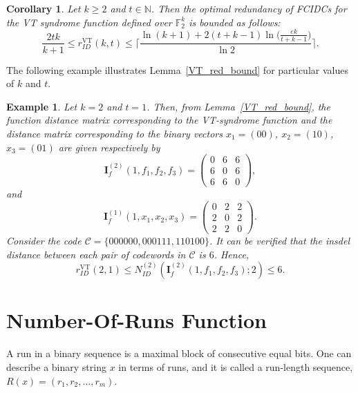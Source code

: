 \documentclass[11 pt]{article}
\numberwithin{equation}{section}
\newtheorem{corollary}[theorem]{Corollary}
\newtheorem{example}[theorem]{Example}
\begin{document}
    \begin{corollary}
        Let $k \geq  2$ and $t \in \mathbb{N}$. Then the optimal redundancy of FCIDCs for the VT syndrome function defined over $\mathbb{F}_2^k$ is bounded as follows:
        \[
            \frac{2tk}{k+1} \leq r^{\text{VT}}_{ID}(k, t) \leq \Bigg \lceil \frac{\ln (k+1) + 2(t+k-1)\ln \Big(\frac{ek}{t+ k - 1}\Big)}{\ln 2} \Bigg \rceil.
        \]
    \end{corollary}
    The following example illustrates Lemma~\ref{VT_red_bound} for particular values of $k$ and $t$.


    \begin{example}
        Let \( k = 2 \) and \( t = 1 \). Then, from Lemma~\ref{VT_red_bound}, the function distance matrix corresponding to the VT-syndrome function and the distance matrix corresponding to the binary vectors $x_1 = (00)$, $x_2 = (10)$,  $x_3 = (01)$ are given respectively by
        \[
            \bm{I}_f^{(2)}(1, f_1, f_2, f_3) =
            \begin{pmatrix}
                0 & 6 & 6 \\[4pt]
                6 & 0 & 6 \\[4pt]
                6 & 6 & 0
            \end{pmatrix},
        \]
        and
        \[
            \bm{I}_{\textit{f}}^{(1)}(1, x_1, x_2, x_3) =
            \begin{pmatrix}
                0 & 2 & 2 \\[4pt]
                2 & 0 & 2 \\[4pt]
                2 & 2 & 0
            \end{pmatrix}.
        \]
        Consider the code $\mathcal{C} = \{000000, 000111, 110100\}$. It can be verified that the insdel distance between each pair of codewords in $\mathcal{C}$ is $6$. Hence,
        $$ r^{\text{VT}}_{ID}(2, 1)  \leq N_{ID}^{(2)}(\bm{I}_f^{(2)}(1, f_1, f_2, f_{3}); 2) \leq 6. $$
        \end{example}
\section{Number-Of-Runs Function}
\label{sec:runs}
    
    A run in a binary sequence is a maximal block of consecutive equal bits. One can describe a binary string $x$ in terms of runs, and it is called a run-length sequence, $R(x) = (r_1, r_2, \ldots, r_m)$.
    
\end{document}

